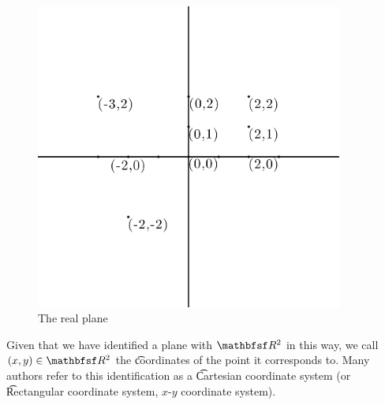 \begin{figure}[h]
\centering
\vspace{0.5cm}

\includegraphics[width=0.90\textwidth]{./graphics/real_plane.pdf}
\caption{The real plane}
\label{real_plane:figure:real_plane}
\end{figure}

Given that we have identified a plane with $\R ^2$ in this way, we call $(x, y) \in \R ^2$ the \t{coordinates} of the point it corresponds to.
Many authors refer to this identification as a \t{Cartesian coordinate system} (or \t{Rectangular coordinate system}, \t{$x$-$y$ coordinate system}).
